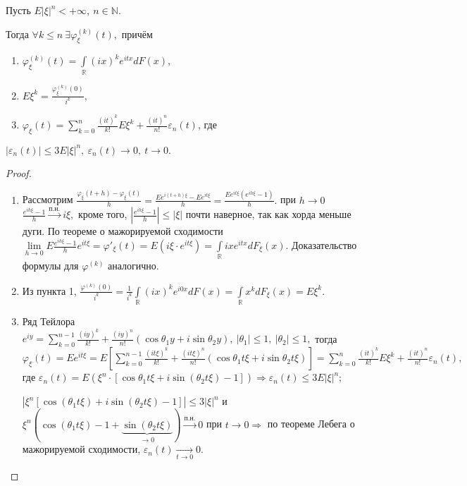 	\begin{property}
	\begin{theorem}[о производных х.ф.]
		Пусть $E|\xi|^n < + \infty, ~n \in \mathbb{N}.$ 
		
		Тогда $\forall k \leqslant n~ \exists \varphi_\xi^{(k)}(t),$ причём
		\begin{enumerate}
			\item $\varphi_\xi^{(k)}(t) = \int\limits_\mathbb{R}(ix)^ke^{itx}dF(x)$,
			\item $E\xi^k = \frac{\varphi_\xi^{(k)}(0)}{i^k}$,
			\item $\varphi_\xi(t) = \sum\limits_{k = 0}^{n} \frac{(it)^k}{k!}E\xi^k + \frac{(it)^n}{n!}\varepsilon_n(t)$, где
		\end{enumerate}
		$|\varepsilon_n(t)| \leqslant 3E|\xi|^n, ~\varepsilon_n(t) \to 0, ~ t \to 0.$
	\end{theorem}
	\begin{proof}
		\begin{enumerate}
			\item Рассмотрим $\frac{\varphi_\xi(t + h) - \varphi_\xi(t)}{h} = \frac{Ee^{i(t + h)\xi} - Ee^{it\xi}}{h} = \frac{Ee^{it\xi}(e^{ih\xi} - 1)}{h}.$ при $h \to 0$ $\frac{e^{ih\xi} - 1}{h} \overset{\text{п.н.}}{\longrightarrow}i\xi,$ кроме того, $\left|\frac{e^{ih\xi} - 1}{h}\right| \leqslant |\xi|$ почти наверное, так как хорда меньше дуги. По теореме о мажорируемой сходимости
			$\lim\limits_{h \to 0}E \frac{e^{ih\xi} - 1}{h}e^{it\xi} = \varphi'_\xi(t) = E(i\xi\cdot e^{it\xi}) = \int\limits_\mathbb{R} ixe^{itx}dF_\xi(x).$ Доказательство формулы для $\varphi^{(k)}$ аналогично.
			\item Из пункта 1, $\frac{\varphi^{(k)}(0)}{i^k} = \frac{1}{i^k} \int\limits_\mathbb{R}(ix)^ke^{i0x}dF(x) = \int\limits_\mathbb{R}x^k dF_\xi(x) = E\xi^k.$
			\item Ряд Тейлора $e^{iy} = \sum\limits_{k = 0}^{n - 1} \frac{(iy)^k}{k!} + \frac{(iy)^n}{n!}(\cos\theta_1y + i\sin\theta_2 y), ~|\theta_1| \leqslant 1, ~ |\theta_2| \leqslant 1,$ тогда
			$\varphi_\xi(t) = Ee^{it\xi} = E\left[\sum\limits_{k = 0}^{n - 1} \frac{(it\xi)^k}{k!} + \frac{(it\xi)^n}{n!}(\cos\theta_1 t\xi + i\sin \theta_2 t\xi)\right] = \sum\limits_{k = 0}^{n}\frac{(it)^k}{k!}E\xi^k + \frac{(it)^n}{n!}\varepsilon_n(t), $ где $\varepsilon_n(t) = E(\xi^n\cdot [\cos\theta_1t\xi + i\sin(\theta_2 t\xi) - 1]) \Rightarrow \varepsilon_n(t) \leqslant 3E|\xi|^n;$

			$|\xi^n[\cos(\theta_1t\xi) + i\sin(\theta_2t\xi) - 1]| \leqslant3|\xi|^n$ и $\xi^n(\cos(\theta_1t\xi) - 1 + \underbrace{\sin(\theta_2 t\xi)}_{\to 0}) \overset{\text{п.н.}}{\longrightarrow} 0$ при $t \to 0 \Rightarrow$ по теореме Лебега о мажорируемой сходимости, $\varepsilon_n(t) \underset{t \to 0}{\longrightarrow} 0.$
		\end{enumerate}
	\end{proof}
	\end{property}
